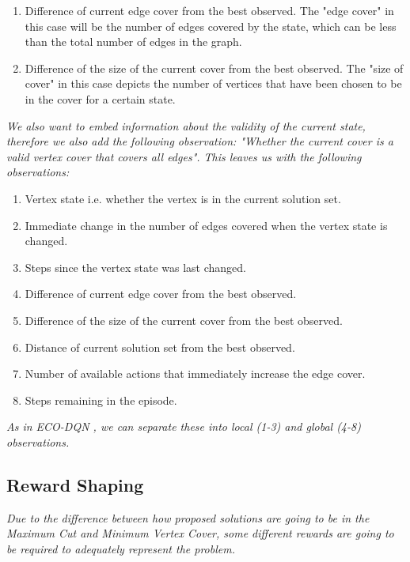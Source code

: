 \documentclass{article}
\begin{document}
\begin{enumerate}
    \item Difference of current edge cover from the best observed. The "edge cover" in this case will be the number of edges covered by the state, which can be less than the total number of edges in the graph.
    \item Difference of the size of the current cover from the best observed. The "size of cover" in this case depicts the number of vertices that have been chosen to be in the cover for a certain state. 
\end{enumerate}

\textit{We also want to embed information about the validity of the current state, therefore we also add the following observation: "Whether the current cover is a valid vertex cover that covers all edges". This leaves us with the following observations:}

\begin{enumerate}
    \item Vertex state i.e. whether the vertex is in the current solution set.
    \item Immediate change in the number of edges covered when the vertex state is changed.
    \item Steps since the vertex state was last changed.
    \item Difference of current edge cover from the best observed.
    \item Difference of the size of the current cover from the best observed.
    \item Distance of current solution set from the best observed. 
    \item Number of available actions that immediately increase the edge cover. 
    \item Steps remaining in the episode.
\end{enumerate}

\textit{As in ECO-DQN \cite{eco-dqn}, we can separate these into local (1-3) and global (4-8) observations.}

\subsection{Reward Shaping}

\textit{Due to the difference between how proposed solutions are going to be in the Maximum Cut and Minimum Vertex Cover, some different rewards are going to be required to adequately represent the problem.}
\end{document}
